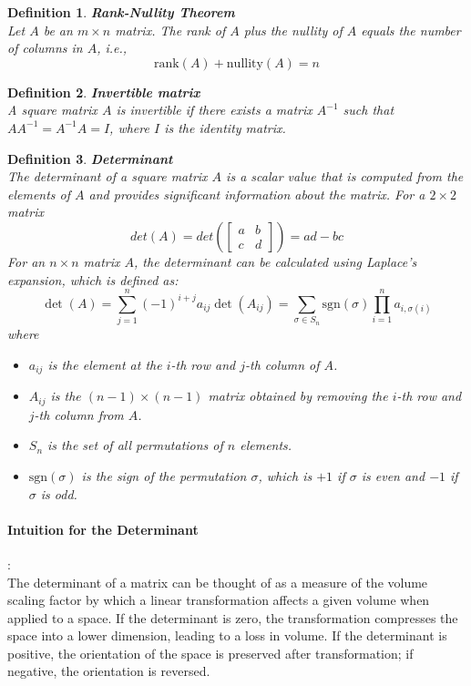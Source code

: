 \documentclass[11pt]{book} %
\newtheorem{definition}{Definition}[section]
\begin{document}
\begin{definition}{\textbf{Rank-Nullity Theorem}} \\
    Let \( A \) be an \( m \times n \) matrix. The rank of \( A \) plus the nullity of \( A \) equals the number of columns in \( A \), i.e., 
    \[
    \text{rank}(A) + \text{nullity}(A) = n
    \]
\end{definition}

\begin{definition}{\textbf{Invertible matrix}} \\
    A square matrix \( A \) is invertible if there exists a matrix \( A^{-1} \) such that \( A A^{-1} = A^{-1} A = I \), where \( I \) is the identity matrix.
\end{definition}


\begin{definition}{\textbf{Determinant}} \\
    The determinant of a square matrix \( A \) is a scalar value that is computed from the elements of \( A \) and provides significant information about the matrix.     
    For a \( 2 \times 2 \) matrix 
    \[
    det(A) = det( \begin{bmatrix} a & b \\ c & d \end{bmatrix} ) = ad - bc
    \]
    For an \( n \times n \) matrix \( A \), the determinant can be calculated using Laplace's expansion, which is defined as:
    \[
    \det(A) = \sum_{j=1}^{n} (-1)^{i+j} a_{ij} \det(A_{ij}) = \sum_{\sigma \in S_n} \text{sgn}(\sigma) \prod_{i=1}^{n} a_{i, \sigma(i)}
    \]
    where 
    \begin{itemize}
        \item \( a_{ij} \) is the element at the \( i \)-th row and \( j \)-th column of \( A \).
        \item \( A_{ij} \) is the \((n-1) \times (n-1)\) matrix obtained by removing the \( i \)-th row and \( j \)-th column from \( A \).
        \item \( S_n \) is the set of all permutations of \( n \) elements.
        \item \( \text{sgn}(\sigma) \) is the sign of the permutation \( \sigma \), which is \( +1 \) if \( \sigma \) is even and \( -1 \) if \( \sigma \) is odd.
    \end{itemize}
\end{definition}

\paragraph{Intuition for the Determinant} : \\
The determinant of a matrix can be thought of as a measure of the volume scaling factor by which a linear transformation affects a given volume when applied to a space. If the determinant is zero, the transformation compresses the space into a lower dimension, leading to a loss in volume. If the determinant is positive, the orientation of the space is preserved after transformation; if negative, the orientation is reversed.
\end{document}
